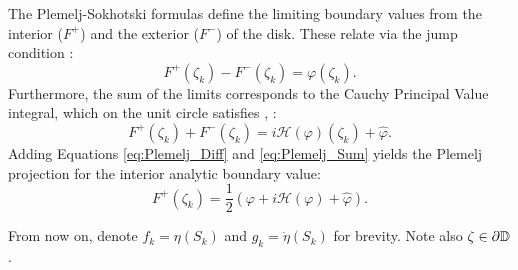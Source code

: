 The Plemelj-Sokhotski formulas \cite[§ 17]{Muskhelishvili1977} define the limiting boundary values from the interior ($F^+$) and the exterior ($F^-$) of the disk. 
These relate via the jump condition \cite[Eq. 17.3]{Muskhelishvili1977}:
\begin{equation}\label{eq:Plemelj_Diff}
    F^+(\zeta_k) - F^-(\zeta_k) = \varphi(\zeta_k).
\end{equation}
Furthermore, the sum of the limits corresponds to the Cauchy Principal Value integral, which on the unit circle satisfies \cite[Lemma 14.2e]{Henrici1986_vol3}, \cite[Eq. 17.4]{Muskhelishvili1977}:
\begin{equation}\label{eq:Plemelj_Sum}
    F^+(\zeta_k) + F^-(\zeta_k) = i\mathcal{H}(\varphi)(\zeta_k)+\hat\varphi.
\end{equation}
Adding Equations \ref{eq:Plemelj_Diff} and \ref{eq:Plemelj_Sum} yields the Plemelj projection for the interior analytic boundary value:
\begin{equation}\label{eq:Plemelj_Projection}
    F^+(\zeta_k) = \frac{1}{2} (\varphi + i \mathcal{H}(\varphi) + \hat\varphi).
\end{equation}

\begin{remark}
    From now on, denote $f_k = \eta(S_k)$ and $g_k = \dot\eta(S_k)$ for brevity.
    Note also $\zeta\in\partial\mathbb{D}$.
\end{remark}

